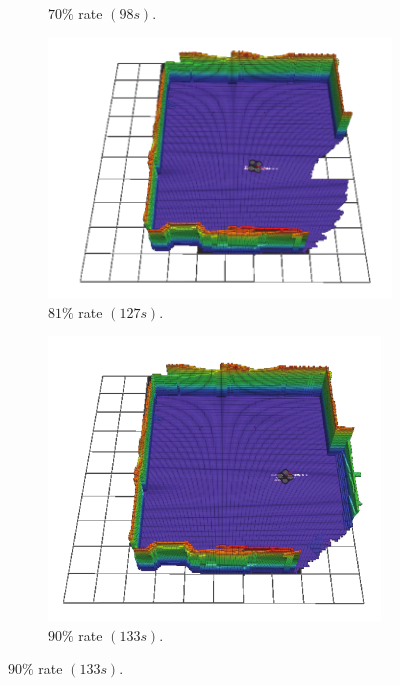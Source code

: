 \documentclass[11pt,openany]{book}
\begin{document}
\begin{figure}[H]
\begin{subfigure}[H]{0.3\linewidth}
        \caption{{$70\%$ rate $(98s).$}}
        \label{fig:3.13g}
    \end{subfigure}
    \begin{subfigure}[H]{0.3\linewidth}
        \centering
        \includegraphics[width=\linewidth]{assets/3_13_h.png}
        \caption{{$81\%$ rate $(127s).$}}
        \label{fig:3.13h}
    \end{subfigure}
    \begin{subfigure}[H]{0.3\linewidth}
        \centering
        \includegraphics[width=\linewidth]{assets/3_13_i.png}
        \caption{{$90\%$ rate $(133s).$}}

\end{subfigure}
\end{figure}
\end{document}
